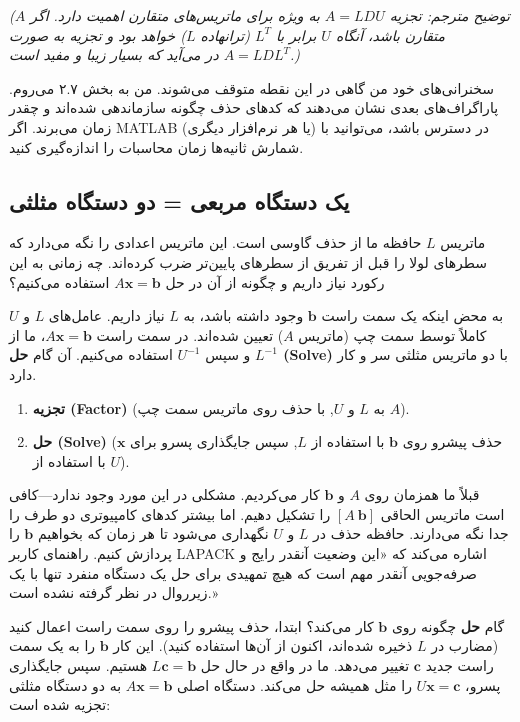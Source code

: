 \documentclass[12pt, a4paper]{book}
\begin{document}
	\textit{(توضیح مترجم: تجزیه $A=LDU$ به ویژه برای ماتریس‌های متقارن اهمیت دارد. اگر $A$ متقارن باشد، آنگاه $U$ برابر با $L^T$ (ترانهاده $L$) خواهد بود و تجزیه به صورت $A=LDL^T$ در می‌آید که بسیار زیبا و مفید است.)}
	
	سخنرانی‌های خود من گاهی در این نقطه متوقف می‌شوند. من به بخش ۲.۷ می‌روم. پاراگراف‌های بعدی نشان می‌دهند که کدهای حذف چگونه سازماندهی شده‌اند و چقدر زمان می‌برند. اگر MATLAB (یا هر نرم‌افزار دیگری) در دسترس باشد، می‌توانید با شمارش ثانیه‌ها زمان محاسبات را اندازه‌گیری کنید.
	
	\subsection*{یک دستگاه مربعی = دو دستگاه مثلثی}
	ماتریس $L$ حافظه ما از حذف گاوسی است. این ماتریس اعدادی را نگه می‌دارد که سطرهای لولا را قبل از تفریق از سطرهای پایین‌تر ضرب کرده‌اند. چه زمانی به این رکورد نیاز داریم و چگونه از آن در حل $A\mathbf{x}=\mathbf{b}$ استفاده می‌کنیم؟
	
	به محض اینکه یک سمت راست $\mathbf{b}$ وجود داشته باشد، به $L$ نیاز داریم. عامل‌های $L$ و $U$ کاملاً توسط سمت چپ (ماتریس $A$) تعیین شده‌اند. در سمت راست $A\mathbf{x}=\mathbf{b}$، ما از $L^{-1}$ و سپس $U^{-1}$ استفاده می‌کنیم. آن گام \textbf{حل (Solve)} با دو ماتریس مثلثی سر و کار دارد.
	
	\begin{enumerate}
		\item \textbf{تجزیه (Factor)} (به $L$ و $U$, با حذف روی ماتریس سمت چپ $A$).
		\item \textbf{حل (Solve)} (حذف پیشرو روی $\mathbf{b}$ با استفاده از $L$, سپس جایگذاری پسرو برای $\mathbf{x}$ با استفاده از $U$).
	\end{enumerate}
	
	قبلاً ما همزمان روی $A$ و $\mathbf{b}$ کار می‌کردیم. مشکلی در این مورد وجود ندارد—کافی است ماتریس الحاقی $[A \ \mathbf{b}]$ را تشکیل دهیم. اما بیشتر کدهای کامپیوتری دو طرف را جدا نگه می‌دارند. حافظه حذف در $L$ و $U$ نگهداری می‌شود تا هر زمان که بخواهیم $\mathbf{b}$ را پردازش کنیم. راهنمای کاربر LAPACK اشاره می‌کند که «این وضعیت آنقدر رایج و صرفه‌جویی آنقدر مهم است که هیچ تمهیدی برای حل یک دستگاه منفرد تنها با یک زیرروال در نظر گرفته نشده است.»
	
	گام \textbf{حل} چگونه روی $\mathbf{b}$ کار می‌کند؟ ابتدا، حذف پیشرو را روی سمت راست اعمال کنید (مضارب در $L$ ذخیره شده‌اند، اکنون از آن‌ها استفاده کنید). این کار $\mathbf{b}$ را به یک سمت راست جدید $\mathbf{c}$ تغییر می‌دهد. ما در واقع در حال حل $L\mathbf{c} = \mathbf{b}$ هستیم. سپس جایگذاری پسرو، $U\mathbf{x}=\mathbf{c}$ را مثل همیشه حل می‌کند. دستگاه اصلی $A\mathbf{x}=\mathbf{b}$ به دو دستگاه مثلثی تجزیه شده است:
	
\end{document}
